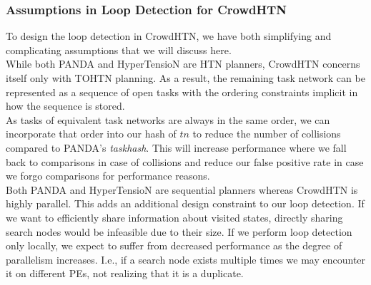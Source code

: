 \subsubsection{Assumptions in Loop Detection for CrowdHTN}
\label{ld - tohtn simplifications}
To design the loop detection in CrowdHTN, we have both simplifying and complicating assumptions that we will discuss here. \\
While both PANDA and HyperTensioN are HTN planners, CrowdHTN concerns itself only with TOHTN planning. As a result, the remaining task network can be represented as a sequence of open tasks with the ordering constraints implicit in how the sequence is stored. \\
As tasks of equivalent task networks are always in the same order, we can incorporate that order into our hash of $tn$ to reduce the number of collisions compared to PANDA's \textit{taskhash}. This will increase performance where we fall back to comparisons in case of collisions and reduce our false positive rate in case we forgo comparisons for performance reasons. \\
Both PANDA and HyperTensioN are sequential planners whereas CrowdHTN is highly parallel. This adds an additional design constraint to our loop detection. If we want to efficiently share information about visited states, directly sharing search nodes would be infeasible due to their size. If we perform loop detection only locally, we expect to suffer from decreased performance as the degree of parallelism increases. I.e., if a search node exists multiple times we may encounter it on different PEs, not realizing that it is a duplicate.
\begin{comment}
	- keep the part where we store loop detection information externally
	- be sure we can always assume total order (and keep the ordering information to reduce false-positive rate!)
	- keep completeness of the planner
	- improve on the performance for hashing!
\end{comment}


